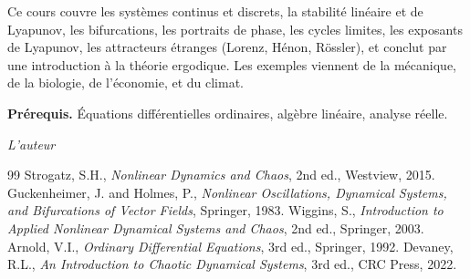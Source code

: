 \documentclass[12pt,a4paper,twoside]{book}
\theoremstyle{definition}
\theoremstyle{plain}
\theoremstyle{remark}
\begin{document}
Ce cours couvre les syst\`emes continus et discrets, la stabilit\'e lin\'eaire et de Lyapunov, les bifurcations, les portraits de phase, les cycles limites, les exposants de Lyapunov, les attracteurs \'etranges (Lorenz, H\'enon, R\"ossler), et conclut par une introduction \`a la th\'eorie ergodique. Les exemples viennent de la m\'ecanique, de la biologie, de l'\'economie, et du climat.

\medskip

\noindent\textbf{Pr\'erequis.} \'Equations diff\'erentielles ordinaires, alg\`ebre lin\'eaire, analyse r\'eelle.

\vfill
\hfill\textit{L'auteur}


\mainmatter














\backmatter
\begin{thebibliography}{99}
 Strogatz, S.H., \emph{Nonlinear Dynamics and Chaos}, 2nd ed., Westview, 2015.
 Guckenheimer, J. and Holmes, P., \emph{Nonlinear Oscillations, Dynamical Systems, and Bifurcations of Vector Fields}, Springer, 1983.
 Wiggins, S., \emph{Introduction to Applied Nonlinear Dynamical Systems and Chaos}, 2nd ed., Springer, 2003.
 Arnold, V.I., \emph{Ordinary Differential Equations}, 3rd ed., Springer, 1992.
 Devaney, R.L., \emph{An Introduction to Chaotic Dynamical Systems}, 3rd ed., CRC Press, 2022.
\end{thebibliography}
\printindex
\end{document}
